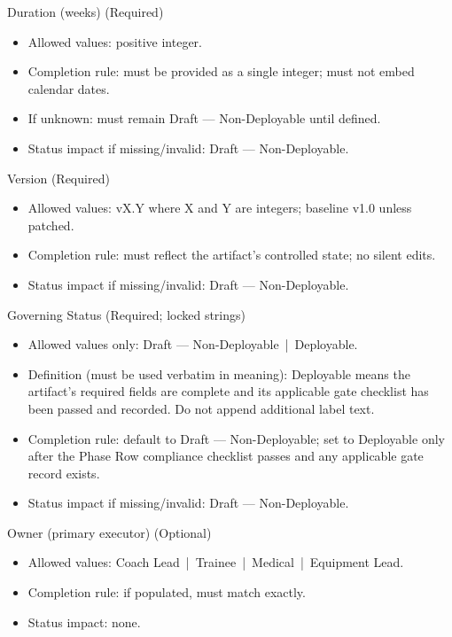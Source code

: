 \documentclass[10pt]{article}
\begin{document}
Duration (weeks) (Required)

\begin{itemize}
\item Allowed values: positive integer.
\item Completion rule: must be provided as a single integer; must not embed calendar dates.
\item If unknown: must remain Draft — Non-Deployable until defined.
\item Status impact if missing/invalid: Draft — Non-Deployable.
\end{itemize}

Version (Required)

\begin{itemize}
\item Allowed values: vX.Y where X and Y are integers; baseline v1.0 unless patched.
\item Completion rule: must reflect the artifact’s controlled state; no silent edits.
\item Status impact if missing/invalid: Draft — Non-Deployable.
\end{itemize}

Governing Status (Required; locked strings)

\begin{itemize}
\item Allowed values only: Draft — Non-Deployable \,|\, Deployable.
\item Definition (must be used verbatim in meaning): Deployable means the artifact’s required fields are complete and its applicable gate checklist has been passed and recorded. Do not append additional label text.
\item Completion rule: default to Draft — Non-Deployable; set to Deployable only after the Phase Row compliance checklist passes and any applicable gate record exists.
\item Status impact if missing/invalid: Draft — Non-Deployable.
\end{itemize}

Owner (primary executor) (Optional)

\begin{itemize}
\item Allowed values: Coach Lead \,|\, Trainee \,|\, Medical \,|\, Equipment Lead.
\item Completion rule: if populated, must match exactly.
\item Status impact: none.
\end{itemize}
\end{document}
